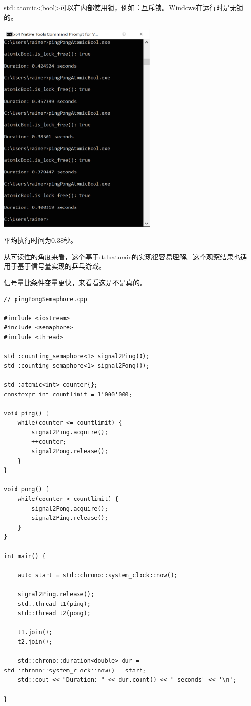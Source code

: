 std::atomic<bool>可以在内部使用锁，例如：互斥锁。Windows在运行时是无锁的。

\begin{center}
\includegraphics[width=0.6\textwidth]{content/3/chapter7/images/5.png}\\
\end{center}

平均执行时间为0.38秒。

从可读性的角度来看，这个基于std::atomic的实现很容易理解。这个观察结果也适用于基于信号量实现的乒乓游戏。


信号量比条件变量更快，来看看这是不是真的。

\begin{lstlisting}[style=styleCXX]
// pingPongSemaphore.cpp

#include <iostream>
#include <semaphore>
#include <thread>

std::counting_semaphore<1> signal2Ping(0);
std::counting_semaphore<1> signal2Pong(0);

std::atomic<int> counter{};
constexpr int countlimit = 1'000'000;

void ping() {
	while(counter <= countlimit) {
		signal2Ping.acquire();
		++counter;
		signal2Pong.release();
	}
}

void pong() {
	while(counter < countlimit) {
		signal2Pong.acquire();
		signal2Ping.release();
	}
}

int main() {

	auto start = std::chrono::system_clock::now();
	
	signal2Ping.release();
	std::thread t1(ping);
	std::thread t2(pong);
	
	t1.join();
	t2.join();
	
	std::chrono::duration<double> dur = std::chrono::system_clock::now() - start;
	std::cout << "Duration: " << dur.count() << " seconds" << '\n';

}
\end{lstlisting}

